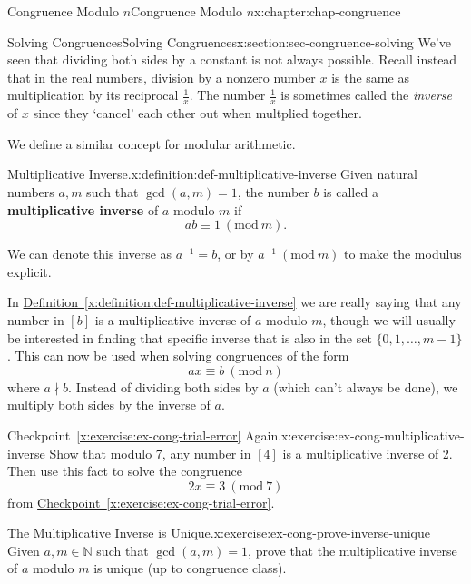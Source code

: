 \documentclass[oneside,10pt,]{book}
\newcommand{\xreffont}{\relax}
\newcommand{\terminology}[1]{\textbf{#1}}
\numberwithin{equation}{section}
\newcommand{\Mod}[1]{\ \left(\mathrm{mod}\ #1\right)}
\begin{document}
\begin{chapterptx}{Congruence Modulo \(n\)}{}{Congruence Modulo \(n\)}{}{}{x:chapter:chap-congruence}
\begin{sectionptx}{Solving Congruences}{}{Solving Congruences}{}{}{x:section:sec-congruence-solving}
We've seen that dividing both sides by a constant is not always possible. Recall instead that in the real numbers, division by a nonzero number \(x\) is the same as multiplication by its reciprocal \(\frac{1}{x}\). The number \(\frac{1}{x}\) is sometimes called the \emph{inverse} of \(x\) since they `cancel' each other out when multplied together.%
\par
We define a similar concept for modular arithmetic.%
\begin{definition}{Multiplicative Inverse.}{x:definition:def-multiplicative-inverse}%
Given natural numbers \(a, m\) such that \(\gcd(a,m) = 1\), the number \(b\) is called a \terminology{multiplicative inverse} of \(a\) modulo \(m\) if%
\begin{equation*}
ab \equiv 1 \Mod{m}\text{.}
\end{equation*}
%
\par
We can denote this inverse as \(a^{-1} = b\), or by \(a^{-1} \Mod{m}\) to make the modulus explicit.%
\end{definition}
In \hyperref[x:definition:def-multiplicative-inverse]{Definition~{\xreffont\ref{x:definition:def-multiplicative-inverse}}} we are really saying that any number in \([b]\) is a multiplicative inverse of \(a\) modulo \(m\), though we will usually be interested in finding that specific inverse that is also in the set \(\{0,1,\ldots,m-1\}\). This can now be used when solving congruences of the form%
\begin{equation*}
ax \equiv b \Mod{n}
\end{equation*}
where \(a \nmid b\). Instead of dividing both sides by \(a\) (which can't always be done), we multiply both sides by the inverse of \(a\).%
\begin{inlineexercise}{Checkpoint~{\xreffont\ref*{x:exercise:ex-cong-trial-error}} Again.}{x:exercise:ex-cong-multiplicative-inverse}%
Show that modulo 7, any number in \([4]\) is a multiplicative inverse of 2. Then use this fact to solve the congruence%
\begin{equation*}
2x \equiv 3 \Mod{7}
\end{equation*}
from \hyperref[x:exercise:ex-cong-trial-error]{Checkpoint~{\xreffont\ref{x:exercise:ex-cong-trial-error}}}.%
\end{inlineexercise}
\begin{inlineexercise}{The Multiplicative Inverse is Unique.}{x:exercise:ex-cong-prove-inverse-unique}%
Given \(a, m \in \mathbb{N}\) such that \(\gcd(a,m) = 1\), prove that the multiplicative inverse of \(a\) modulo \(m\) is unique (up to congruence class).%

\end{inlineexercise}
\end{sectionptx}
\end{chapterptx}
\end{document}
